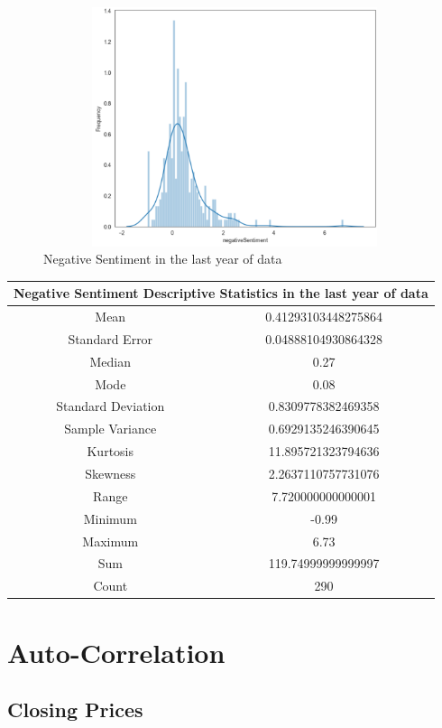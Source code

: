 \begin{figure}[h!]
\centering
\includegraphics[width=15cm,height=7cm,keepaspectratio]{resultsEvaluation/negativeDesc1.png}
\caption{Negative Sentiment in the last year of data}
\label{fig:appendix_negativeDesc1}
\end{figure}
\begin{center}
\begin{tabular}{ c c }
\hline
\multicolumn{2}{|c|}{Negative Sentiment Descriptive Statistics in the last year of data} \\
\hline
Mean & 0.41293103448275864 \\
Standard Error & 0.04888104930864328 \\
Median & 0.27 \\
Mode & 0.08 \\
Standard Deviation & 0.8309778382469358 \\
Sample Variance & 0.6929135246390645 \\
Kurtosis & 11.895721323794636 \\
Skewness & 2.2637110757731076 \\
Range & 7.720000000000001 \\
Minimum & -0.99 \\
Maximum & 6.73 \\
Sum & 119.74999999999997 \\
Count & 290
\end{tabular}
\end{center}

\section{Auto-Correlation}
\label{appendix:autocorrelation}

\subsection{Closing Prices}

